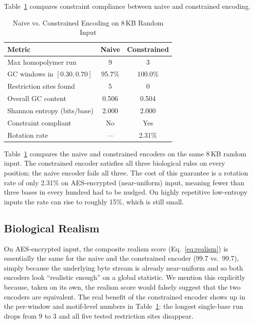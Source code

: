 \documentclass[conference]{IEEEtran}
\begin{document}
Table~\ref{tab:constraints} compares constraint compliance between naive and constrained encoding.

\begin{table}[htbp]
\caption{Naive vs. Constrained Encoding on 8\,KB Random Input}
\begin{center}
\begin{tabular}{|l|c|c|}
\hline
\textbf{Metric} & \textbf{Naive} & \textbf{Constrained} \\
\hline
Max homopolymer run & 9 & 3 \\
\hline
GC windows in $[0.30, 0.70]$ & 95.7\% & 100.0\% \\
\hline
Restriction sites found & 5 & 0 \\
\hline
Overall GC content & 0.506 & 0.504 \\
\hline
Shannon entropy (bits/base) & 2.000 & 2.000 \\
\hline
Constraint compliant & No & Yes \\
\hline
Rotation rate & --- & 2.31\% \\
\hline
\end{tabular}
\label{tab:constraints}
\end{center}
\end{table}

Table~\ref{tab:constraints} compares the naive and constrained encoders on the same 8\,KB random input. The constrained encoder satisfies all three biological rules on every position; the naive encoder fails all three. The cost of this guarantee is a rotation rate of only 2.31\% on AES-encrypted (near-uniform) input, meaning fewer than three bases in every hundred had to be nudged. On highly repetitive low-entropy inputs the rate can rise to roughly 15\%, which is still small.

\subsection{Biological Realism}

On AES-encrypted input, the composite realism score (Eq.~\ref{eq:realism}) is essentially the same for the naive and the constrained encoder (99.7 vs.\ 99.7), simply because the underlying byte stream is already near-uniform and so both encoders look ``realistic enough'' on a global statistic. We mention this explicitly because, taken on its own, the realism score would falsely suggest that the two encoders are equivalent. The real benefit of the constrained encoder shows up in the per-window and motif-level numbers in Table~\ref{tab:constraints}: the longest single-base run drops from 9 to 3 and all five tested restriction sites disappear.
\end{document}

